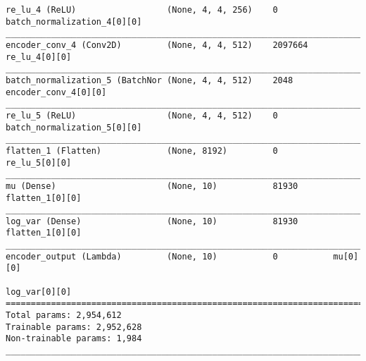 \begin{lstlisting}[caption={(dSprites, 7,500, 6,250, 5,000, 3,750)-\ac{VAE} Encoder},captionpos=b,basicstyle=\tiny, label={lst:dsprites-vae-encoder}]
re_lu_4 (ReLU)                  (None, 4, 4, 256)    0           batch_normalization_4[0][0]
__________________________________________________________________________________________________
encoder_conv_4 (Conv2D)         (None, 4, 4, 512)    2097664     re_lu_4[0][0]
__________________________________________________________________________________________________
batch_normalization_5 (BatchNor (None, 4, 4, 512)    2048        encoder_conv_4[0][0]
__________________________________________________________________________________________________
re_lu_5 (ReLU)                  (None, 4, 4, 512)    0           batch_normalization_5[0][0]
__________________________________________________________________________________________________
flatten_1 (Flatten)             (None, 8192)         0           re_lu_5[0][0]
__________________________________________________________________________________________________
mu (Dense)                      (None, 10)           81930       flatten_1[0][0]
__________________________________________________________________________________________________
log_var (Dense)                 (None, 10)           81930       flatten_1[0][0]
__________________________________________________________________________________________________
encoder_output (Lambda)         (None, 10)           0           mu[0][0]
                                                                 log_var[0][0]
==================================================================================================
Total params: 2,954,612
Trainable params: 2,952,628
Non-trainable params: 1,984
__________________________________________________________________________________________________
\end{lstlisting}